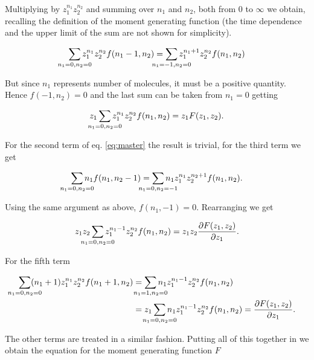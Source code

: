 Multiplying by $z_1^{n_1}z_2^{n_2}$ and summing over $n_1$ and $n_2$, both from $0$ to $\infty$ we obtain, recalling the definition of the moment generating function (the time dependence and the upper limit of the sum are not shown for simplicity).

\begin{equation*}
\sum_{\mathclap{n_1=0,n_2=0}} z_1^{n_1}z_2^{n_2}f(n_1-1,n_2) = \sum_{\mathclap{n_1=-1,n_2=0}}z_1^{n_1+1}z_2^{n_2}f(n_1,n_2)
\end{equation*}

But since $n_1$ represents number of molecules, it must be a positive quantity. Hence $f(-1,n_2)=0$ and the last sum can be taken from $n_1=0$ getting

\begin{equation}
\label{eq:mom1}
z_1 \sum_{\mathclap{n_1=0,n_2=0}}z_1^{n_1}z_2^{n_2}f(n_1,n_2) = z_1F(z_1,z_2).
\end{equation}

For the second term of eq. \ref{eq:master} the result is trivial, for the third term we get

\begin{equation*}
\sum_{\mathclap{n_1=0,n_2=0}}n_1f(n_1,n_2-1) = \sum_{\mathclap{n_1=0,n_2=-1}}n_1z_1^{n_1}z_2^{n_2+1}f(n_1,n_2).
\end{equation*}

Using the same argument as above, $f(n_1,-1) = 0$. Rearranging we get

\begin{equation}
z_1 z_2 \sum_{\mathclap{n_1=0,n_2=0}} z_1^{n_1-1}z_2^{n_2}f(n_1,n_2) = z_1 z_2 \frac{\partial F(z_1,z_2)}{\partial z_1}.
\end{equation}

For the fifth term

\begin{equation}
\label{eq:mom4}
\begin{split}
\sum_{\mathclap{n_1=0,n_2=0}}(n_1+1)z_1^{n_1}z_2^{n_2}f(n_1+1,n_2) &= \sum_{\mathclap{n_1=1,n_2=0}}n_1z_1^{n_1-1}z_2^{n_2}f(n_1,n_2)\\ 
&= z_1 \sum_{\mathclap{n_1=0,n_2=0}}n_1z_1^{n_1-1}z_2^{n_2}f(n_1,n_2) = \frac{\partial F(z_1,z_2)}{\partial z_1}.
\end{split}
\end{equation}

The other terms are treated in a similar fashion. Putting all of this together in we obtain the equation for the moment generating function $F$

